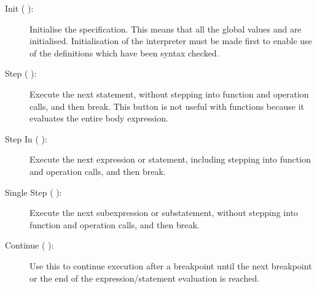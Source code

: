 \documentclass[\pformat,12pt]{article}
\newcommand{\guicmd}[1]{{\sf #1}}
\begin{document}
\begin{description}
\item[\guicmd{Init} (\hspace{-1.8mm}
):]
Initialise the specification. This means that all the
  global values and  are initialised. Initialisation of the interpreter must be
made first to enable use of the definitions which have been syntax checked.

\item[\guicmd{Step} (\hspace{-1.8mm}
):] 
Execute the next statement, without stepping into
  function and operation calls,
  and then break. This button is not useful with functions because it
  evaluates the entire body expression.
  
\item[\guicmd{Step In} (\hspace{-1.8mm}
):] 
Execute the next expression or statement, including
  stepping into function and operation calls, and then
  break.
  
\item[\guicmd{Single Step} (\hspace{-1.8mm}
):] 
Execute the next subexpression or substatement, without
  stepping into function and operation calls, and then
  break.

\item[\guicmd{Continue} (\hspace{-1.8mm}
):] 
Use this to continue execution after a
  breakpoint until the next breakpoint or the end of the
  expression/statement evaluation is reached.
  

\end{description}
\end{document}
